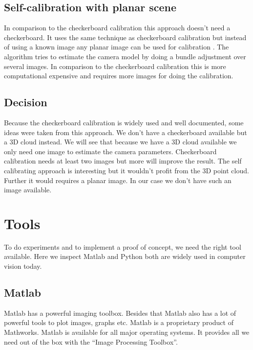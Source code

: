 \documentclass[11pt,a4paper,titlepage,oneside]{report}
\begin{document}
\subsection{Self-calibration with planar scene}
In comparison to the checkerboard calibration this approach doesn't need a checkerboard. It uses the same technique as checkerboard calibration but instead of using a known image any planar image can be used for calibration \cite{selfcalib}. The algorithm tries to estimate the camera model by doing a bundle adjustment over several images. In comparison to the checkerboard calibration this is more computational expensive and requires more images for doing the calibration.

\subsection{Decision}
Because the checkerboard calibration is widely used and well documented, some ideas were taken from this approach. We don't have a checkerboard available but a 3D cloud instead. We will see that because we have a 3D cloud available we only need one image to estimate the camera parameters. Checkerboard calibration needs at least two images \cite{Zhang} but more will improve the result. The self calibrating approach is interesting but it wouldn't profit from the 3D point cloud. Further it would requires a planar image. In our case we don't have such an image available.

\section{Tools}
To do experiments and to implement a proof of concept, we need the right tool available. Here we inspect Matlab and Python both are widely used in computer vision today.

\subsection{Matlab}
Matlab has a powerful imaging toolbox. Besides that Matlab also has a lot of powerful tools to plot images, graphs etc. Matlab is a proprietary product of Mathworks. Matlab is available for all major operating systems. It provides all we need out of the box with the ``Image Processing Toolbox''.
\end{document}
